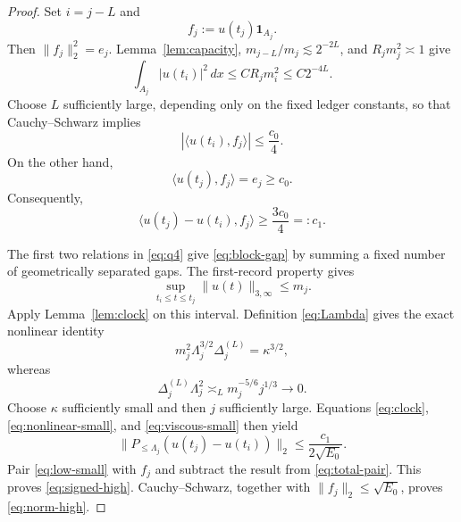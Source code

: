 \documentclass[11pt]{article}
\theoremstyle{remark}
\begin{document}
\begin{proof}
Set \(i=j-L\) and
\[
 f_j:=u(t_j)\mathbf 1_{A_j}.
\]
Then \(\|f_j\|_2^2=e_j\).  Lemma~\ref{lem:capacity},
\(m_{j-L}/m_j\lesssim2^{-2L}\), and \(R_jm_j^2\asymp1\) give
\begin{equation}
 \label{eq:early-empty}
 \int_{A_j}|u(t_i)|^2\,dx
 \leq CR_jm_i^2
 \leq C2^{-4L}.
\end{equation}
Choose \(L\) sufficiently large, depending only on the fixed ledger
constants, so that Cauchy--Schwarz implies
\begin{equation}
 \label{eq:old-pair}
 |\langle u(t_i),f_j\rangle|
 \leq\frac{c_0}{4}.
\end{equation}
On the other hand,
\[
 \langle u(t_j),f_j\rangle=e_j\geq c_0.
\]
Consequently,
\begin{equation}
 \label{eq:total-pair}
 \langle u(t_j)-u(t_i),f_j\rangle
 \geq\frac{3c_0}{4}
 =:c_1.
\end{equation}

The first two relations in \eqref{eq:q4} give
\eqref{eq:block-gap} by summing a fixed number of geometrically
separated gaps.  The first-record property gives
\[
 \sup_{t_i\leq t\leq t_j}
 \|u(t)\|_{3,\infty}\leq m_j.
\]
Apply Lemma~\ref{lem:clock} on this interval.  Definition
\eqref{eq:Lambda} gives the exact nonlinear identity
\begin{equation}
 \label{eq:nonlinear-small}
 m_j^2\Lambda_j^{3/2}\Delta_j^{(L)}
 =\kappa^{3/2},
\end{equation}
whereas
\begin{equation}
 \label{eq:viscous-small}
 \Delta_j^{(L)}\Lambda_j^2
 \asymp_Lm_j^{-5/6}j^{1/3}
 \longrightarrow0.
\end{equation}
Choose \(\kappa\) sufficiently small and then \(j\) sufficiently large.
Equations \eqref{eq:clock}, \eqref{eq:nonlinear-small}, and
\eqref{eq:viscous-small} then yield
\begin{equation}
 \label{eq:low-small}
 \|P_{\leq\Lambda_j}(u(t_j)-u(t_i))\|_2
 \leq\frac{c_1}{2\sqrt{E_0}}.
\end{equation}
Pair \eqref{eq:low-small} with \(f_j\) and subtract the result from
\eqref{eq:total-pair}.  This proves \eqref{eq:signed-high}.
Cauchy--Schwarz, together with \(\|f_j\|_2\leq\sqrt{E_0}\), proves
\eqref{eq:norm-high}.
\end{proof}
\end{document}
